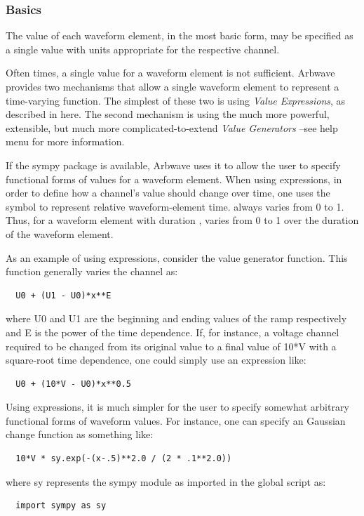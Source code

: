 \subsubsection{Basics}
The value of each waveform element, in the most basic form, may be specified as
a single value with units appropriate for the respective channel.

Often times, a single value for a waveform element is not sufficient.  Arbwave
provides two mechanisms that allow a single waveform element to represent a
time-varying function.  The simplest of these two is using \textit{Value
Expressions}, as described in here.  The second mechanism is using the much more
powerful, extensible, but much more complicated-to-extend \textit{Value
Generators }--see help menu for more information.

If the sympy package is available, Arbwave uses it to allow the user to specify
functional forms of values for a waveform element.  When using expressions, in
order to define how a channel's value should change over time, one uses the
symbol  to represent relative waveform-element time.
 always varies
from 0 to 1.  Thus, for a waveform element with duration ,
 varies from 0 to 1
over the duration of the waveform element.

As an example of using expressions, consider the  value generator
function.  This function generally varies the channel as:
%
\begin{lstlisting}
  U0 + (U1 - U0)*x**E
\end{lstlisting}
%
where U0 and U1 are the beginning and ending values of the ramp respectively and
E is the power of the time dependence.  If, for instance, a voltage channel
required to be changed from its original value to a final value of 10*V with a
square-root time dependence, one could simply use an expression like:
%
\begin{lstlisting}
  U0 + (10*V - U0)*x**0.5
\end{lstlisting}
%
Using expressions, it is much simpler for the user to specify somewhat arbitrary
functional forms of waveform values.  For instance, one can specify an Gaussian
change function as something like:
%
\begin{lstlisting}
  10*V * sy.exp(-(x-.5)**2.0 / (2 * .1**2.0))
\end{lstlisting}
%
where sy represents the sympy module as imported in the global script as:
\begin{lstlisting}
  import sympy as sy
\end{lstlisting}

